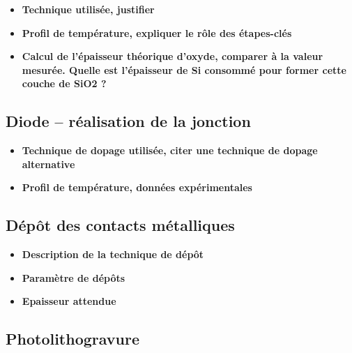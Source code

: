 \documentclass[11pt]{article}
\begin{document}
\begin{itemize}

\item \textbf{Technique utilis\'ee, justifier}

\item \textbf{Profil de temp\'erature, expliquer le r\^ole des \'etapes-cl\'es}

\item \textbf{Calcul de l'\'epaisseur th\'eorique d'oxyde, comparer \`a la valeur mesur\'ee. Quelle est l'\'epaisseur de Si
        consomm\'e pour former cette couche de SiO2 ?}
\end{itemize}

\subsection{Diode -- r\'ealisation de la jonction}

\begin{itemize}

\item \textbf{Technique de dopage utilis\'ee, citer une technique de dopage alternative }

\item \textbf{Profil de temp\'erature, donn\'ees exp\'erimentales}

\end{itemize}

\subsection{D\'ep\^ot des contacts m\'etalliques}

\begin{itemize}

\item \textbf{Description de la technique de d\'ep\^ot}

\item \textbf{Param\`etre de d\'ep\^ots}

\item \textbf{Epaisseur attendue}

\end{itemize}

\subsection{Photolithogravure}
\end{document}
